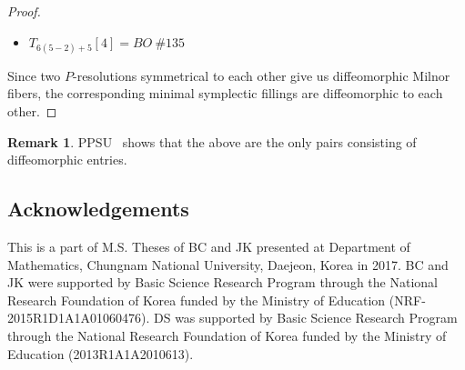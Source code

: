\documentclass[reqno, twoside, a4paper]{amsart}
\theoremstyle{definition}
\newtheorem{remark}[theorem]{Remark}
\numberwithin{equation}{section}
\begin{document}
\begin{proof}
\begin{multicols}{2}
\begin{itemize}
\end{itemize}

\columnbreak

\begin{itemize}
\item $T_{6(5-2)+5}[4] = BO~\#135$

\end{itemize}
\end{multicols}

Since two $P$-resolutions symmetrical to each other give us diffeomorphic Milnor fibers, the corresponding minimal symplectic fillings are  diffeomorphic to each other.
\end{proof}

\begin{remark}
PPSU~\cite[Theorem~5.5]{PPSU-2015} shows that the above are the only pairs consisting of diffeomorphic entries.
\end{remark}






\subsection*{Acknowledgements}

This is a part of M.S. Theses of BC and JK presented at Department of Mathematics, Chungnam National University, Daejeon, Korea in 2017. BC and JK were supported by Basic Science Research Program through the National Research Foundation of Korea funded by the Ministry of Education (NRF-2015R1D1A1A01060476). DS was supported by Basic Science Research Program through the National Research Foundation of Korea funded by the Ministry of Education (2013R1A1A2010613).
\end{document}
